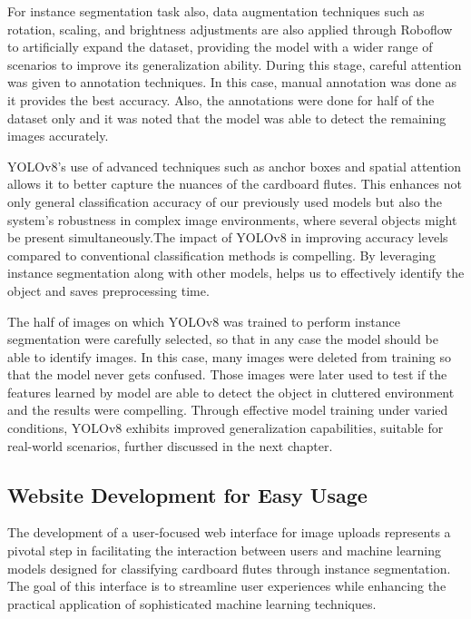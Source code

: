 For instance segmentation task also, data augmentation techniques such as rotation, scaling, and brightness adjustments are also applied through Roboflow to artificially expand the dataset, providing the model with a wider range of scenarios to improve its generalization ability. During this stage, careful attention was given to annotation techniques. In this case, manual annotation was done as it provides the best accuracy. Also, the annotations were done for half of the dataset only and it was noted that the model was able to detect the remaining images accurately.

YOLOv8's use of advanced techniques such as anchor boxes and spatial attention allows it to better capture the nuances of the cardboard flutes. This enhances not only general classification accuracy of our previously used models but also the system's robustness in complex image environments, where several objects might be present simultaneously.The impact of YOLOv8 in improving accuracy levels compared to conventional classification methods is compelling. By leveraging instance segmentation along with other models, helps us to  effectively identify the object and saves preprocessing time.

The half of images on which YOLOv8 was trained to perform instance segmentation were carefully selected, so that in any case the model should be able to identify images. In this case, many images were deleted from training so that the model never gets confused. Those images were later used to test if the features learned by model are able to detect the object in cluttered environment and the results were compelling. Through effective model training under varied conditions, YOLOv8 exhibits improved generalization capabilities, suitable for real-world scenarios, further discussed in the next chapter.


\subsection{Website Development for Easy Usage}

The development of a user-focused web interface for image uploads represents a pivotal step in facilitating the interaction between users and machine learning models designed for classifying cardboard flutes through instance segmentation. The goal of this interface is to streamline user experiences while enhancing the practical application of sophisticated machine learning techniques.

